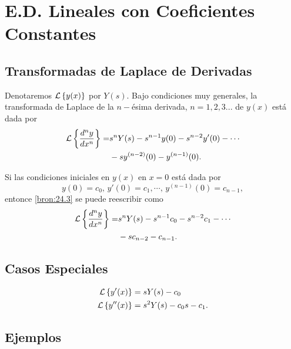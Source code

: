 \section{E.D. Lineales con Coeficientes Constantes}

\subsection{Transformadas de Laplace de Derivadas}


 Denotaremos $\mathcal{L}\left\{ y(x) \right\}$ por $Y(s).$ Bajo condiciones muy generales, la transformada de Laplace de la $n-$\'esima derivada, $n=1,2,3...$ de $y(x)$ está dada por
 \begin{equation}
 \label{bron:24.1}
 \begin{split}
  \mathcal{L}\left\{ \dfrac{d^{n}y}{dx^{n}} \right\}=&
  s^{n}Y(s)-s^{n-1}y(0)-s^{n-2}y'(0)-\cdots\\
    &-sy^{(n-2)}(0)-y^{(n-1)}(0).
    \end{split}
 \end{equation}




 Si las condiciones iniciales en $y(x)$ en $x=0$ está dada por
 \begin{equation}
  \label{bron:24.2}
  y(0)=c_{0}, \, y'(0)=c_{1}, \cdots , \, y^{(n-1)}(0)=c_{n-1},
 \end{equation}
entonce \eqref{bron:24.3} se puede reescribir como
 \begin{equation}
 \label{bron:24.3}
 \begin{split}
  \mathcal{L}\left\{ \dfrac{d^{n}y}{dx^{n}} \right\}=&
  s^{n}Y(s)-s^{n-1}c_{0}-s^{n-2}c_{1}-\cdots\\
    &-sc_{n-2}-c_{n-1}.
    \end{split}
 \end{equation}




 \subsection{Casos Especiales}
 \begin{align}
  \label{bron:24.4}
  \mathcal{L}\left\{ y'(x) \right\}&=sY(s)-c_{0}\\
  \mathcal{L}\left\{ y''(x) \right\}&=s^{2}Y(s)-c_{0}s-c_{1}.
 \end{align}



\subsection{Ejemplos}



